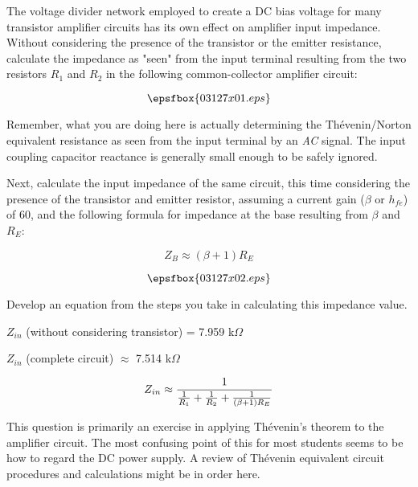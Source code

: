 

The voltage divider network employed to create a DC bias voltage for many transistor amplifier circuits has its own effect on amplifier input impedance.  Without considering the presence of the transistor or the emitter resistance, calculate the impedance as "seen" from the input terminal resulting from the two resistors $R_1$ and $R_2$ in the following common-collector amplifier circuit:

$$\epsfbox{03127x01.eps}$$

Remember, what you are doing here is actually determining the Th\'evenin/Norton equivalent resistance as seen from the input terminal by an {\it AC} signal.  The input coupling capacitor reactance is generally small enough to be safely ignored.

\vskip 10pt

Next, calculate the input impedance of the same circuit, this time considering the presence of the transistor and emitter resistor, assuming a current gain ($\beta$ or $h_{fe}$) of 60, and the following formula for impedance at the base resulting from $\beta$ and $R_E$:

$$Z_B \approx (\beta + 1)R_E$$

$$\epsfbox{03127x02.eps}$$

Develop an equation from the steps you take in calculating this impedance value.







$Z_{in}$ (without considering transistor) = 7.959 k$\Omega$

\vskip 10pt

$Z_{in}$ (complete circuit) $\approx$ 7.514 k$\Omega$

$$Z_{in} \approx {1 \over {{1 \over R_1} + {1 \over R_2} + {1 \over (\beta + 1) R_E}}}$$







This question is primarily an exercise in applying Th\'evenin's theorem to the amplifier circuit.  The most confusing point of this for most students seems to be how to regard the DC power supply.  A review of Th\'evenin equivalent circuit procedures and calculations might be in order here.

